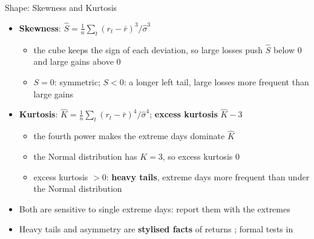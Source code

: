 \begin{frame}{Shape: Skewness and Kurtosis}
\itemsize{\small}
\begin{itemize}
    \item \textbf{Skewness}: $\hat S = \frac1n \sum_t (r_t - \bar r)^3 / \hat\sigma^3$
    \begin{itemize}
        \item the cube keeps the sign of each deviation, so large losses push $\hat S$ below 0 and large gains above 0
        \item $S = 0$: symmetric; $S < 0$: a longer left tail, large losses more frequent than large gains
    \end{itemize}
    \item \textbf{Kurtosis}: $\hat K = \frac1n \sum_t (r_t - \bar r)^4 / \hat\sigma^4$; \textbf{excess kurtosis} $\hat K - 3$
    \begin{itemize}
        \item the fourth power makes the extreme days dominate $\hat K$
        \item the Normal distribution has $K = 3$, so excess kurtosis 0
        \item excess kurtosis $> 0$: \textbf{heavy tails}, extreme days more frequent than under the Normal distribution
    \end{itemize}
    \item Both are sensitive to single extreme days: report them with the extremes
    \item Heavy tails and asymmetry are \textbf{stylised facts} of returns ; formal tests in 
\end{itemize}
\end{frame}

